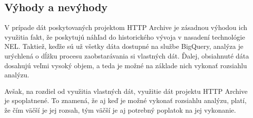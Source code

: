\subsection{Výhody a nevýhody}

V prípade dát poskytovaných projektom HTTP Archive je zásadnou výhodou ich využitia fakt, že poskytujú náhľad do historického vývoja v nasadení technológie NEL.
Taktiež, keďže sú už všetky dáta dostupné na službe BigQuery, analýza je urýchlená o dĺžku procesu zaobstarávania si vlastných dát.
Ďalej, obsiahnuté dáta dosahujú veľmi vysoký objem, a teda je možné na základe nich vykonať rozsiahlu analýzu.

Avšak, na rozdiel od využitia vlastných dát, využitie dát projektu HTTP Archive je spoplatnené.
To znamená, že aj keď je možné vykonať rozsiahlu analýzu, platí, že čím väčší je jej rozsah, tým väčší je aj potrebný poplatok na jej vykonanie.